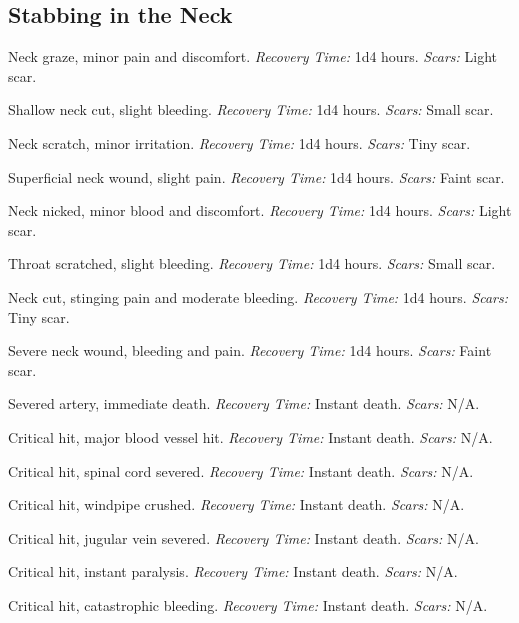 \subsection{Stabbing in the Neck}

\begin{description}[labelwidth=1.5em, leftmargin=*, itemsep=0.4em]
    \item[1 -] Neck graze, minor pain and discomfort. \textit{Recovery Time:} 1d4 hours. \textit{Scars:} Light scar.
    \item[2 -] Shallow neck cut, slight bleeding. \textit{Recovery Time:} 1d4 hours. \textit{Scars:} Small scar.
    \item[3 -] Neck scratch, minor irritation. \textit{Recovery Time:} 1d4 hours. \textit{Scars:} Tiny scar.
    \item[4 -] Superficial neck wound, slight pain. \textit{Recovery Time:} 1d4 hours. \textit{Scars:} Faint scar.
    \item[5 -] Neck nicked, minor blood and discomfort. \textit{Recovery Time:} 1d4 hours. \textit{Scars:} Light scar.
    \item[6 -] Throat scratched, slight bleeding. \textit{Recovery Time:} 1d4 hours. \textit{Scars:} Small scar.
    \item[7 -] Neck cut, stinging pain and moderate bleeding. \textit{Recovery Time:} 1d4 hours. \textit{Scars:} Tiny scar.
    \item[8 -] Severe neck wound, bleeding and pain. \textit{Recovery Time:} 1d4 hours. \textit{Scars:} Faint scar.
    \item[9 -] Severed artery, immediate death. \textit{Recovery Time:} Instant death. \textit{Scars:} N/A.
    \item[10 -] Critical hit, major blood vessel hit. \textit{Recovery Time:} Instant death. \textit{Scars:} N/A.
    \item[11 -] Critical hit, spinal cord severed. \textit{Recovery Time:} Instant death. \textit{Scars:} N/A.
    \item[12 -] Critical hit, windpipe crushed. \textit{Recovery Time:} Instant death. \textit{Scars:} N/A.
    \item[13 -] Critical hit, jugular vein severed. \textit{Recovery Time:} Instant death. \textit{Scars:} N/A.
    \item[14 -] Critical hit, instant paralysis. \textit{Recovery Time:} Instant death. \textit{Scars:} N/A.
    \item[15 -] Critical hit, catastrophic bleeding. \textit{Recovery Time:} Instant death. \textit{Scars:} N/A.

\end{description}

